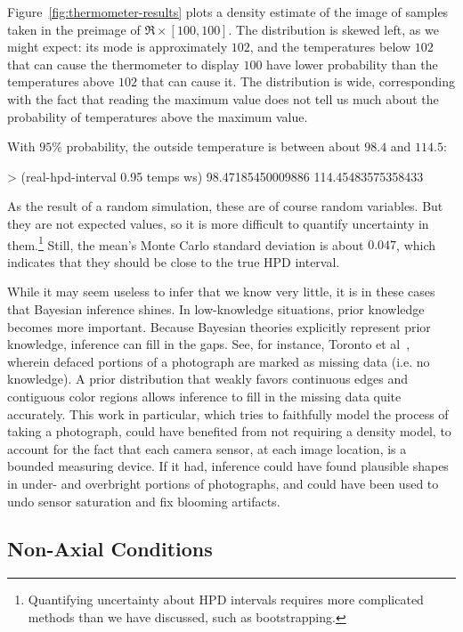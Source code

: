 Figure~\ref{fig:thermometer-results} plots a density estimate of the image of samples taken in the preimage of $\Re \times [100,100]$.
The distribution is skewed left, as we might expect: its mode is approximately $102$, and the temperatures below $102$ that can cause the thermometer to display $100$ have lower probability than the temperatures above $102$ that can cause it.
The distribution is wide, corresponding with the fact that reading the maximum value does not tell us much about the probability of temperatures above the maximum value.

With $95\%$ probability, the outside temperature is between about $98.4$ and $114.5$:
\begin{center}\singlespacing
\begin{schemedisplay}
> (real-hpd-interval 0.95 temps ws)
98.47185450009886
114.45483575358433
\end{schemedisplay}
\end{center}
As the result of a random simulation, these are of course random variables.
But they are not expected values, so it is more difficult to quantify uncertainty in them.\footnote{Quantifying uncertainty about HPD intervals requires more complicated methods than we have discussed, such as bootstrapping.}
Still, the mean's Monte Carlo standard deviation is about $0.047$, which indicates that they should be close to the true HPD interval.

While it may seem useless to infer that we know very little, it is in these cases that Bayesian inference shines.
In low-knowledge situations, prior knowledge becomes more important.
Because Bayesian theories explicitly represent prior knowledge, inference can fill in the gaps.
See, for instance, Toronto et al~\cite{cit:toronto-2009cvpr}, wherein defaced portions of a photograph are marked as missing data (i.e. no knowledge).
A prior distribution that weakly favors continuous edges and contiguous color regions allows inference to fill in the missing data quite accurately.
This work in particular, which tries to faithfully model the process of taking a photograph, could have benefited from not requiring a density model, to account for the fact that each camera sensor, at each image location, is a bounded measuring device.
If it had, inference could have found plausible shapes in under- and overbright portions of photographs, and could have been used to undo sensor saturation and fix blooming artifacts.


\subsection{Non-Axial Conditions}

